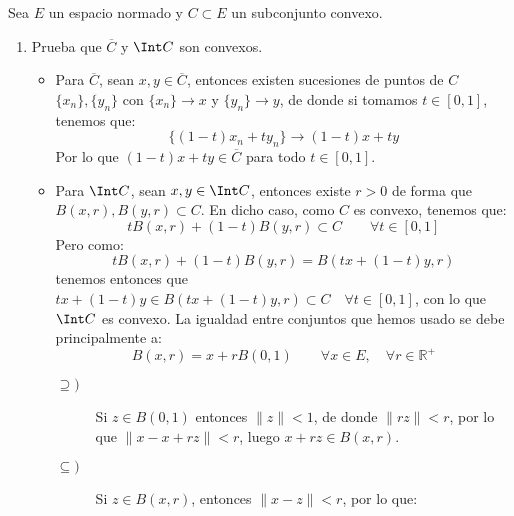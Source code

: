 \begin{ejercicio}
    Sea $E$ un espacio normado y $C\subset E$ un subconjunto convexo.
    \begin{enumerate}[label=\alph*)]
        \item Prueba que $\overline{C}$ y $\Int C$ son convexos.

            \begin{itemize}
                \item Para $\overline{C}$, sean $x,y\in \overline{C}$, entonces existen sucesiones de puntos de $C$ $\{x_n\},\{y_n\}$ con $\{x_n\}\to x$ y $\{y_n\}\to y$, de donde si tomamos $t\in [0,1]$, tenemos que:
                    \begin{equation*}
                        \{(1-t)x_n + ty_n\} \to (1-t)x+ty
                    \end{equation*}
                    Por lo que $(1-t)x+ty\in \overline{C}$ para todo $t\in [0,1]$.
                \item Para $\Int C$, sean $x,y\in \Int C$, entonces existe $r>0$ de forma que $B(x,r),B(y,r)\subset C$. En dicho caso, como $C$ es convexo, tenemos que:
                    \begin{equation*}
                        tB(x,r) + (1-t)B(y,r) \subset C \qquad \forall t\in [0,1]
                    \end{equation*}
                    Pero como:
                    \begin{equation*}
                        tB(x,r) + (1-t)B(y,r) = B(tx+(1-t)y,r)
                    \end{equation*}
                    tenemos entonces que $tx + (1-t)y \in B(tx+(1-t)y,r)\subset C\quad \forall t\in [0,1]$, con lo que $\Int C$ es convexo. La igualdad entre conjuntos que hemos usado se debe principalmente a:
                    \begin{equation*}
                        B(x,r) = x+rB(0,1) \qquad \forall x\in E, \quad \forall r\in \mathbb{R}^+
                    \end{equation*}
                    \begin{description}
                        \item [$\supseteq )$] Si $z\in B(0,1)$ entonces $\|z\|<1$, de donde $\|rz\| < r$, por lo que $\|x-x+rz\| < r$, luego $x+rz\in B(x,r)$.
                        \item [$\subseteq )$] Si $z\in B(x,r)$, entonces $\|x-z\| < r$, por lo que:
                            \begin{equation*}

\end{equation*}
\end{description}
\end{itemize}
\end{enumerate}
\end{ejercicio}
